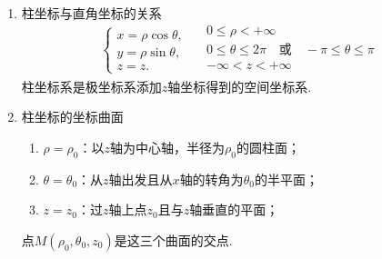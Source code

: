 \begin{enumerate}[]
	\setlength{\topsep}{0.01em}
	\setlength{\itemsep}{0.01em}
	\item {\color{dy}柱坐标与直角坐标的关系}
	\begin{equation}
	\begin{cases}
	x=\rho \cos\theta,\\
	y=\rho \sin\theta ,\\
	z=z.
	\end{cases}
	\quad 
	\begin{array}{l}
	0 \le \rho < +\infty\\
	0 \le \theta \le 2\pi \quad \mbox{或} \quad  -\pi \le \theta \le \pi\\
	-\infty < z < +\infty\\
	\end{array}
	\end{equation}
							{\color{dy}柱坐标系}是极坐标系添加$z$轴坐标得到的空间坐标系.
				\item {\color{dy}柱坐标的坐标曲面}
	\begin{enumerate}[]
		\setlength{\itemindent}{1em}
		\setlength{\topsep}{0.01em}
		\setlength{\itemsep}{0.01em}
		\item $\rho = \rho_0 $：以$z$轴为中心轴，半径为$\rho_0$的{\color{dy}圆柱面}；
		\item $\theta =\theta_0$：从$z$轴出发且从$x$轴的转角为$\theta_0$的{\color{dy}半平面}；
		\item $z =z_0$：过$z$轴上点$z_0$且与$z$轴垂直的{\color{dy}平面}；
	\end{enumerate}
	点$M(\rho_0,\theta_0,z_0)$是这三个曲面的交点.
\end{enumerate}


